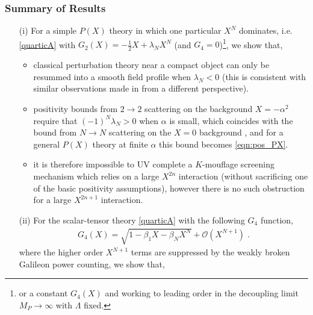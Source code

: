\documentclass[11pt]{article}
\begin{document}
\subsubsection*{Summary of Results} 
\begin{itemize}

\item[(i)] For a simple $P(X)$ theory in which one particular $X^N$ dominates, i.e. \eqref{quarticA} with 
 $G_2 (X) = -\tfrac{1}{2} X + \lambda_N X^N$ (and $G_4 = 0$)\footnote{
or a constant $G_4 (X)$ and working to leading order in the decoupling limit $M_P\to\infty$ with $\Lambda$ fixed. 
}, we show that,

\begin{itemize}

\item classical perturbation theory near a compact object can only be resummed into a smooth field profile when $\lambda_N < 0$ (this is consistent with similar observations made in \cite{Brax:2014gra} from a different perspective).

\item positivity bounds from $2\to2$ scattering on the background $X=-\alpha^2$  require that $(-1)^N \lambda_N > 0$ when $\alpha$ is small, which coincides with the bound from $N \to N$ scattering on the $X=0$ background \cite{Chandrasekaran:2018qmx}, and for a general $P(X)$ theory at finite $\alpha$ this bound becomes  \eqref{eqn:pos_PX}.

\item it is therefore impossible to UV complete a $K$-mouflage screening mechanism which relies on a large $X^{2n}$ interaction (without sacrificing one of the basic positivity assumptions), however there is no such obstruction for a large $X^{2n+1}$ interaction.

\end{itemize}



\item[(ii)] For the scalar-tensor theory \eqref{quarticA} with the following $G_4$ function,
\begin{align}
 G_4 (X) = \sqrt{ 1 - \beta_1 X  - \beta_{N} X^{N}  } + \mathcal{O} \left( X^{N+1} \right)  \; .
 \label{eqn:G4sq_intro}
\end{align}
where the higher order $X^{N+1}$ terms are suppressed by the weakly broken Galileon power counting, we show that, 

\begin{itemize} 


\end{itemize}
\end{itemize}
\end{document}
